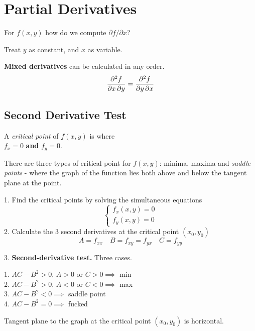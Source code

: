 \section{Partial Derivatives}

For $f(x,y)$ how do we compute $\partial f / \partial x$?

Treat $y$ as constant, and $x$ as variable.

\textbf{Mixed derivatives} can be calculated in any order.
\begin{equation*}
    \pdv{f}{x,y} = \pdv{f}{y,x}
\end{equation*}

\subsection*{Second Derivative Test}

A \textit{critical point} of $f(x,y)$ is where \\
$f_x = 0$ \textbf{and} $f_y = 0$.

There are three types of critical point for $f(x,y)$: minima, maxima and \textit{saddle points} - where the graph
of the function lies both above and below the tangent plane at the point.
\vspace{\baselineskip}

1. Find the critical points by solving the simultaneous equations
\begin{equation*}
\begin{cases}
    f_x(x,y) = 0 \\
    f_y(x,y) = 0
\end{cases}
\end{equation*}
2. Calculate the 3 second derivatives at the critical point $(x_0, y_0)$
\begin{equation*}
    A = f_{xx} \quad B = f_{xy} = f_{yx} \quad C = f_{yy}
\end{equation*}

3. \textbf{Second-derivative test.} Three cases.

1. $AC - B^2 > 0$, $A > 0$ or $C > 0 \implies$ min \\
2. $AC - B^2 > 0$, $A < 0$ or $C < 0 \implies$ max \\
3. $AC - B^2 < 0 \implies$ saddle point \\
4. $AC - B^2 = 0 \implies$ fucked

Tangent plane to the graph at the critical point $(x_0, y_0)$ is horizontal.